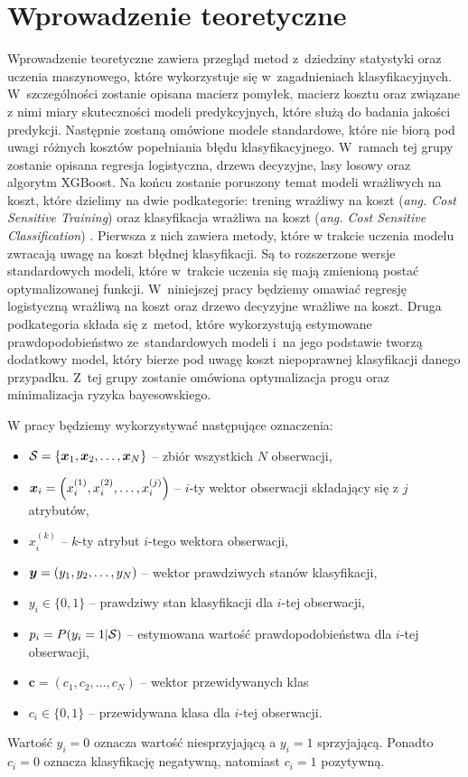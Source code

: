 \documentclass[inzynierska]{pwr_wmat_praca_dyplomowa}
\theoremstyle{plain}
\numberwithin{theorem}{chapter}
\theoremstyle{definition}
\numberwithin{theorem}{chapter}
\begin{document}
\chapter{Wprowadzenie teoretyczne}

Wprowadzenie teoretyczne zawiera przegląd metod z~dziedziny statystyki oraz uczenia maszynowego, które wykorzystuje się w~zagadnieniach klasyfikacyjnych. W~szczególności zostanie opisana macierz pomyłek, macierz kosztu oraz związane z nimi miary skuteczności modeli predykcyjnych, które służą do badania jakości predykcji. Następnie zostaną omówione modele standardowe, które nie biorą pod uwagi różnych kosztów popełniania błędu klasyfikacyjnego. W~ramach tej grupy zostanie opisana regresja logistyczna, drzewa decyzyjne, lasy losowy oraz algorytm XGBoost. Na końcu zostanie poruszony temat modeli wrażliwych na koszt, które dzielimy na dwie podkategorie: trening wrażliwy na koszt (\textit{ang. Cost Sensitive Training}) oraz klasyfikacja wrażliwa na koszt (\textit{ang. Cost Sensitive Classification}) \cite{RMoser}. Pierwsza z nich zawiera metody, które w trakcie uczenia modelu zwracają uwagę na koszt błędnej klasyfikacji. Są to rozszerzone wersje standardowych modeli, które w~trakcie uczenia się mają zmienioną postać optymalizowanej funkcji. W~niniejszej pracy będziemy omawiać regresję logistyczną wrażliwą na koszt oraz drzewo decyzyjne wrażliwe na koszt. Druga podkategoria składa się z~metod, które wykorzystują estymowane prawdopodobieństwo ze~standardowych modeli i~na jego podstawie tworzą dodatkowy model, który bierze pod uwagę koszt niepoprawnej klasyfikacji danego przypadku. Z~tej grupy zostanie omówiona optymalizacja progu oraz minimalizacja ryzyka bayesowskiego.

W pracy będziemy wykorzystywać następujące oznaczenia:
\begin{itemize}
	\item $\mathcal{S} = \{\boldsymbol{x}_1, \boldsymbol{x}_2, \dots, \boldsymbol{x}_N \}$ -- zbiór wszystkich $N$ obserwacji,
	\item $\boldsymbol{x}_{i} = \left(x_i^{(1)}, x_i^{(2)}, \dots, x_i^{(j)} \right)$ -- $i$-ty wektor obserwacji składający się z $j$ atrybutów,
	\item $x_i^{(k)}$ -- $k$-ty atrybut $i$-tego wektora obserwacji,
	\item $\boldsymbol{y} = (y_1, y_2, \dots, y_N)$ -- wektor prawdziwych stanów klasyfikacji,
	\item $y_i \in \{0,1\}$ -- prawdziwy stan klasyfikacji dla $i$-tej obserwacji,
	\item $p_i = P(y_i = 1 | \mathcal{S})$ -- estymowana wartość prawdopodobieństwa dla $i$-tej obserwacji,
	\item $\boldsymbol{c} = (c_1, c_2, \dots, c_N) $ -- wektor przewidywanych klas
	\item $c_i \in \{0,1\} $ -- przewidywana klasa dla $i$-tej obserwacji.
\end{itemize}
Wartość $y_i = 0$ oznacza wartość niesprzyjającą a $y_i = 1$ sprzyjającą. Ponadto $c_i = 0$ oznacza klasyfikację negatywną, natomiast $c_i = 1$ pozytywną.
\end{document}
